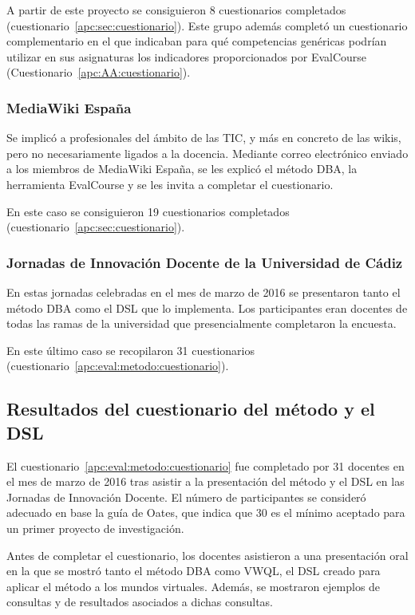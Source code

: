 A partir de este proyecto se consiguieron 8 cuestionarios completados (cuestionario~\ref{apc:sec:cuestionario}). Este grupo además completó un cuestionario complementario en el que indicaban para qué competencias genéricas podrían utilizar en sus asignaturas los indicadores proporcionados por EvalCourse (Cuestionario~\ref{apc:AA:cuestionario}).

	\subsubsection{MediaWiki España}

	Se implicó a profesionales del ámbito de las TIC, y más en concreto de las wikis, pero no necesariamente ligados a la docencia. Mediante correo electrónico enviado a los miembros de MediaWiki España, se les explicó el método DBA, la herramienta EvalCourse y se les invita a completar el cuestionario.		

En este caso se consiguieron 19 cuestionarios completados (cuestionario~\ref{apc:sec:cuestionario}).

	\subsubsection{Jornadas de Innovación Docente de la Universidad de Cádiz}

	En estas jornadas celebradas en el mes de marzo de 2016 se presentaron tanto el método DBA como el DSL que lo implementa. Los participantes eran docentes de todas las ramas de la universidad que presencialmente completaron la encuesta. 

En este último caso se recopilaron 31 cuestionarios (cuestionario~\ref{apc:eval:metodo:cuestionario}). 


\subsection{Resultados del cuestionario del método y el DSL}

El cuestionario~\ref{apc:eval:metodo:cuestionario} fue completado por 31 docentes en el mes de marzo de 2016 tras asistir a la presentación del método y el DSL en las Jornadas de Innovación Docente. El número de participantes se consideró adecuado en base la guía de Oates, que indica que 30 es el mínimo aceptado para un primer proyecto de investigación.

Antes de completar el cuestionario, los docentes asistieron a una presentación oral en la que se mostró tanto el método DBA como VWQL, el DSL creado para aplicar el método a los mundos virtuales. Además, se mostraron ejemplos de consultas y de resultados asociados a dichas consultas. 

